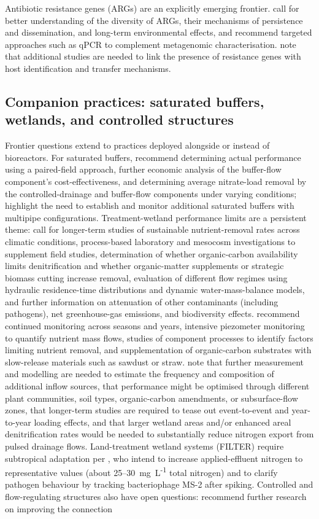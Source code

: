 \documentclass[11pt]{article}
\begin{document}
Antibiotic resistance genes (ARGs) are an explicitly emerging frontier. \textcite{Smith2019b} call for better understanding of the diversity of ARGs, their mechanisms of persistence and dissemination, and long-term environmental effects, and recommend targeted approaches such as qPCR to complement metagenomic characterisation. \textcite{Rieke2018} note that additional studies are needed to link the presence of resistance genes with host identification and transfer mechanisms.

\subsection{Companion practices: saturated buffers, wetlands, and controlled structures}
Frontier questions extend to practices deployed alongside or instead of bioreactors. For saturated buffers, \textcite{Ghane2025} recommend determining actual performance using a paired-field approach, further economic analysis of the buffer-flow component's cost-effectiveness, and determining average nitrate-load removal by the controlled-drainage and buffer-flow components under varying conditions; \textcite{Jaynes2019b} highlight the need to establish and monitor additional saturated buffers with multipipe configurations. Treatment-wetland performance limits are a persistent theme: \textcite{Tanner2005} call for longer-term studies of sustainable nutrient-removal rates across climatic conditions, process-based laboratory and mesocosm investigations to supplement field studies, determination of whether organic-carbon availability limits denitrification and whether organic-matter supplements or strategic biomass cutting increase removal, evaluation of different flow regimes using hydraulic residence-time distributions and dynamic water-mass-balance models, and further information on attenuation of other contaminants (including pathogens), net greenhouse-gas emissions, and biodiversity effects. \textcite{Tanner2003} recommend continued monitoring across seasons and years, intensive piezometer monitoring to quantify nutrient mass flows, studies of component processes to identify factors limiting nutrient removal, and supplementation of organic-carbon substrates with slow-release materials such as sawdust or straw. \textcite{Tanner2005b} note that further measurement and modelling are needed to estimate the frequency and composition of additional inflow sources, that performance might be optimised through different plant communities, soil types, organic-carbon amendments, or subsurface-flow zones, that longer-term studies are required to tease out event-to-event and year-to-year loading effects, and that larger wetland areas and/or enhanced areal denitrification rates would be needed to substantially reduce nitrogen export from pulsed drainage flows. Land-treatment wetland systems (FILTER) require subtropical adaptation per \textcite{Gardner2001}, who intend to increase applied-effluent nitrogen to representative values (about 25--30~mg~L\textsuperscript{-1} total nitrogen) and to clarify pathogen behaviour by tracking bacteriophage MS-2 after spiking. Controlled and flow-regulating structures also have open questions: \textcite{Popek2021} recommend further research on improving the connection 
\end{document}
